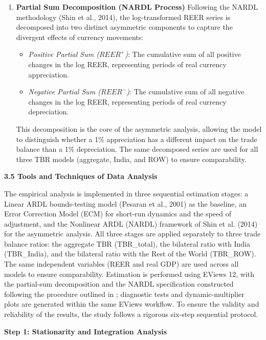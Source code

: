 \documentclass[12pt]{article}
\begin{document}
\begin{enumerate}
    \item \textbf{Partial Sum Decomposition (NARDL Process)}  
    Following the NARDL methodology (Shin et al., 2014), the log-transformed REER series is decomposed into two distinct asymmetric components to capture the divergent effects of currency movements:
    \begin{itemize}
        \item \textit{Positive Partial Sum ($REER^{+}$)}: The cumulative sum of all positive changes in the log REER, representing periods of real currency appreciation.
        \item \textit{Negative Partial Sum ($REER^{-}$)}: The cumulative sum of all negative changes in the log REER, representing periods of real currency depreciation.
    \end{itemize}
    This decomposition is the core of the asymmetric analysis, allowing the model to distinguish whether a 1\% appreciation has a different impact on the trade balance than a 1\% depreciation. The same decomposed series are used for all three TBR models (aggregate, India, and ROW) to ensure comparability.
\end{enumerate}

\vspace{0.5cm}
\noindent\textbf{3.5 Tools and Techniques of Data Analysis}

The empirical analysis is implemented in three sequential estimation stages: a Linear ARDL bounds-testing model (Pesaran et al., 2001) as the baseline, an Error Correction Model (ECM) for short-run dynamics and the speed of adjustment, and the Nonlinear ARDL (NARDL) framework of Shin et al. (2014) for the asymmetric analysis. All three stages are applied separately to three trade balance ratios: the aggregate TBR (TBR\_total), the bilateral ratio with India (TBR\_India), and the bilateral ratio with the Rest of the World (TBR\_ROW). The same independent variables (REER and real GDP) are used across all models to ensure comparability. Estimation is performed using EViews 12, with the partial-sum decomposition and the NARDL specification constructed following the procedure outlined in \textcite{Shin2014-ap}; diagnostic tests and dynamic-multiplier plots are generated within the same EViews workflow. To ensure the validity and reliability of the results, the study follows a rigorous six-step sequential protocol.

\vspace{0.5cm}
\noindent\textbf{Step 1: Stationarity and Integration Analysis}
\end{document}
